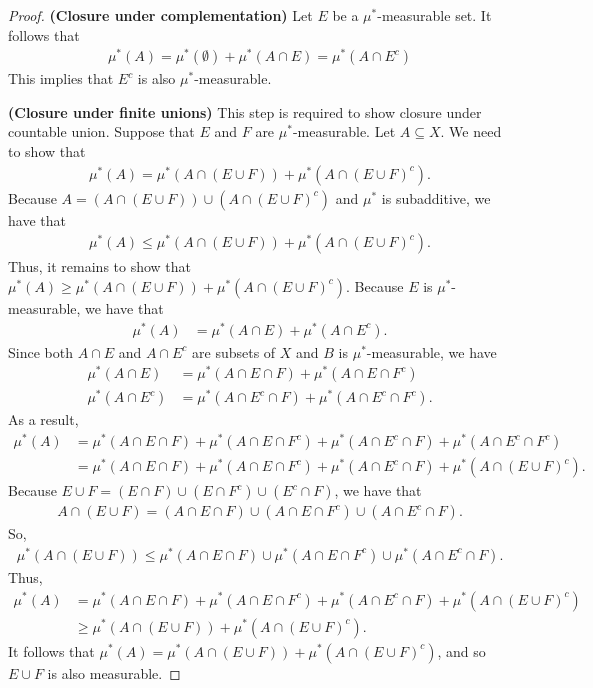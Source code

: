 \documentclass[10pt]{article}
\begin{document}
\begin{itemize}
\begin{proof}
    {\bf (Closure under complementation)} Let $E$ be a $\mu^*$-measurable set. It follows that
    \begin{align*}
      \mu^*(A) = \mu^*(\emptyset) + \mu^*(A \cap E) = \mu^*(A \cap E^c)
    \end{align*}
    This implies that $E^c$ is also $\mu^*$-measurable.

    {\bf (Closure under finite unions)} This step is required to show closure under countable union. Suppose that $E$ and $F$ are $\mu^*$-measurable. Let $A \subseteq X$. We need to show that
    \begin{align*}
      \mu^*(A) = \mu^*(A \cap (E \cup F)) + \mu^*(A \cap (E \cup F)^c).
    \end{align*}
    Because $A = (A \cap (E \cup F)) \cup (A \cap (E \cup F)^c)$ and $\mu^*$ is subadditive, we have that
    \begin{align*}
      \mu^*(A) \leq \mu^*(A \cap (E \cup F)) + \mu^*(A \cap (E \cup F)^c).
    \end{align*}
    Thus, it remains to show that $\mu^*(A) \geq \mu^*(A \cap (E \cup F)) + \mu^*(A \cap (E \cup F)^c)$. Because $E$ is $\mu^*$-measurable, we have that
    \begin{align*}
      \mu^*(A) &= \mu^*(A \cap E) + \mu^*(A \cap E^c).
    \end{align*}
    Since both $A \cap E$ and $A \cap E^c$ are subsets of $X$ and $B$ is $\mu^*$-measurable, we have
    \begin{align*}
      \mu^*(A \cap E) &= \mu^*(A \cap E \cap F) + \mu^*(A \cap E \cap F^c) \\
      \mu^*(A \cap E^c) &= \mu^*(A \cap E^c \cap F) + \mu^*(A \cap E^c \cap F^c).
    \end{align*}
    As a result,
    \begin{align*}
      \mu^*(A) &= \mu^*(A \cap E \cap F) + \mu^*(A \cap E \cap F^c) + \mu^*(A \cap E^c \cap F) + \mu^*(A \cap E^c \cap F^c) \\
      &= \mu^*(A \cap E \cap F) + \mu^*(A \cap E \cap F^c) + \mu^*(A \cap E^c \cap F) + \mu^*(A \cap (E \cup F)^c).
    \end{align*}
    Because $E \cup F = (E \cap F) \cup (E \cap F^c) \cup (E^c \cap F)$, we have that
    \begin{align*}
      A \cap (E \cup F) = (A \cap E \cap F) \cup (A \cap E \cap F^c) \cup (A \cap E^c \cap F).
    \end{align*}
    So,
    \begin{align*}
      \mu^*(A \cap (E \cup F)) \leq \mu^*(A \cap E \cap F) \cup \mu^*(A \cap E \cap F^c) \cup \mu^*(A \cap E^c \cap F).
    \end{align*}
    Thus,
    \begin{align*}
      \mu^*(A) 
      &= \mu^*(A \cap E \cap F) + \mu^*(A \cap E \cap F^c) + \mu^*(A \cap E^c \cap F) + \mu^*(A \cap (E \cup F)^c)\\
      &\geq \mu^*(A \cap (E \cup F)) + \mu^*(A \cap (E \cup F)^c).
    \end{align*}
    It follows that $\mu^*(A) = \mu^*(A \cap (E \cup F)) + \mu^*(A \cap (E \cup F)^c)$, and so $E \cup F$ is also measurable.


\end{proof}
\end{itemize}
\end{document}
